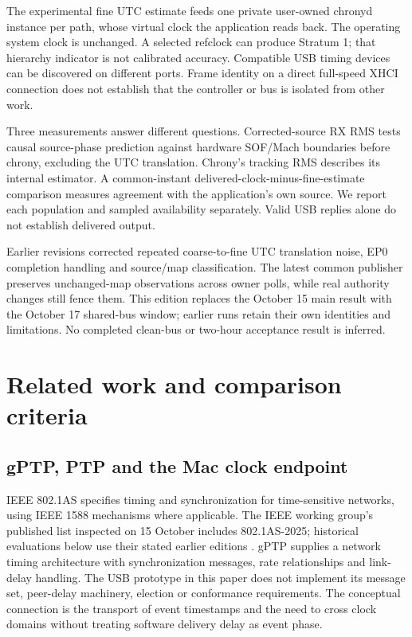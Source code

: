 \documentclass[11pt,letterpaper]{article}
\begin{document}
The experimental fine UTC estimate feeds one private user-owned chronyd instance per path, whose virtual clock the application reads back. The operating system clock is unchanged. A selected refclock can produce Stratum 1; that hierarchy indicator is not calibrated accuracy. Compatible USB timing devices can be discovered on different ports. Frame identity on a direct full-speed XHCI connection does not establish that the controller or bus is isolated from other work.

Three measurements answer different questions. Corrected-source RX RMS tests causal source-phase prediction against hardware SOF/Mach boundaries before chrony, excluding the UTC translation. Chrony's tracking RMS describes its internal estimator. A common-instant delivered-clock-minus-fine-estimate comparison measures agreement with the application's own source. We report each population and sampled availability separately. Valid USB replies alone do not establish delivered output.

Earlier revisions corrected repeated coarse-to-fine UTC translation noise, EP0 completion handling and source/map classification. The latest common publisher preserves unchanged-map observations across owner polls, while real authority changes still fence them. This edition replaces the October 15 main result with the October 17 shared-bus window; earlier runs retain their own identities and limitations. No completed clean-bus or two-hour acceptance result is inferred.

\section{Related work and comparison criteria}\label{sec:related}
\subsection{gPTP, PTP and the Mac clock endpoint}
IEEE 802.1AS specifies timing and synchronization for time-sensitive networks, using IEEE 1588 mechanisms where applicable. The IEEE working group's published list inspected on 15 October includes 802.1AS-2025; historical evaluations below use their stated earlier editions \cite{as2025}. gPTP supplies a network timing architecture with synchronization messages, rate relationships and link-delay handling. The USB prototype in this paper does not implement its message set, peer-delay machinery, election or conformance requirements. The conceptual connection is the transport of event timestamps and the need to cross clock domains without treating software delivery delay as event phase.
\end{document}
